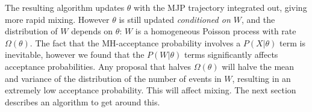 The resulting algorithm updates $\theta$ with the MJP trajectory 
integrated out, giving more rapid mixing.
However $\theta$ is still updated {\em conditioned on
$W$}, and 
the distribution of $W$ depends on $\theta$: 
$W$ is a homogeneous
Poisson process with rate $\Omega(\theta)$. %
The fact that the MH-acceptance probability involves a $P(X|\theta)$ term
is inevitable, however we found that the $P(W|\theta)$
terms significantly affects acceptance probabilities. 
Any proposal that halves $\Omega(\theta)$ will halve the
mean and variance of the distribution of the number of events in $W$, 
resulting in an extremely low acceptance probability.
This will affect mixing.
The next section describes an algorithm to get around this.
\vspace{-.1in}
